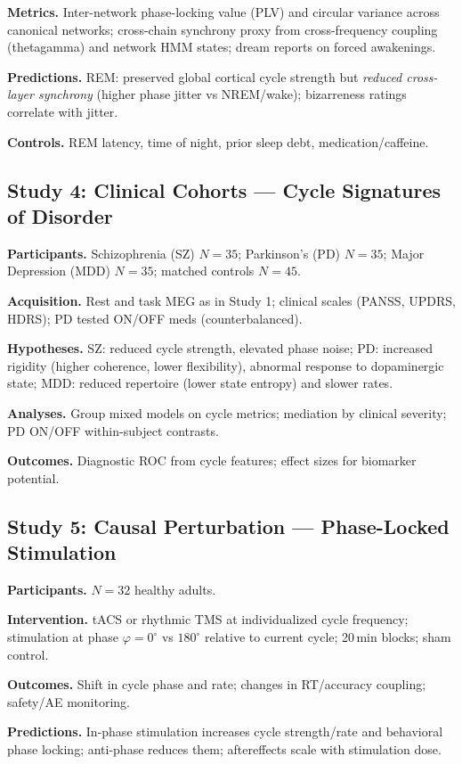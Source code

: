 \documentclass{article}
\begin{document}
\textbf{Metrics.} Inter-network phase-locking value (PLV) and circular variance across canonical networks; cross-chain synchrony proxy from cross-frequency coupling (theta{\textrightarrow}gamma) and network HMM states; dream reports on forced awakenings.

\textbf{Predictions.} REM: preserved global cortical cycle strength but \emph{reduced cross-layer synchrony} (higher phase jitter vs NREM/wake); bizarreness ratings correlate with jitter.

\textbf{Controls.} REM latency, time of night, prior sleep debt, medication/caffeine.

\subsection{Study 4: Clinical Cohorts --- Cycle Signatures of Disorder}
\textbf{Participants.} Schizophrenia (SZ) $N{=}35$; Parkinson’s (PD) $N{=}35$; Major Depression (MDD) $N{=}35$; matched controls $N{=}45$.

\textbf{Acquisition.} Rest and task MEG as in Study 1; clinical scales (PANSS, UPDRS, HDRS); PD tested ON/OFF meds (counterbalanced).

\textbf{Hypotheses.} SZ: reduced cycle strength, elevated phase noise; PD: increased rigidity (higher coherence, lower flexibility), abnormal response to dopaminergic state; MDD: reduced repertoire (lower state entropy) and slower rates.

\textbf{Analyses.} Group mixed models on cycle metrics; mediation by clinical severity; PD ON/OFF within-subject contrasts.

\textbf{Outcomes.} Diagnostic ROC from cycle features; effect sizes for biomarker potential.

\subsection{Study 5: Causal Perturbation --- Phase-Locked Stimulation}
\textbf{Participants.} $N{=}32$ healthy adults.

\textbf{Intervention.} tACS or rhythmic TMS at individualized cycle frequency; stimulation at phase $\varphi{=}0^\circ$ vs $180^\circ$ relative to current cycle; 20\,min blocks; sham control.

\textbf{Outcomes.} Shift in cycle phase and rate; changes in RT/accuracy coupling; safety/AE monitoring.

\textbf{Predictions.} In-phase stimulation increases cycle strength/rate and behavioral phase locking; anti-phase reduces them; aftereffects scale with stimulation dose.
\end{document}

